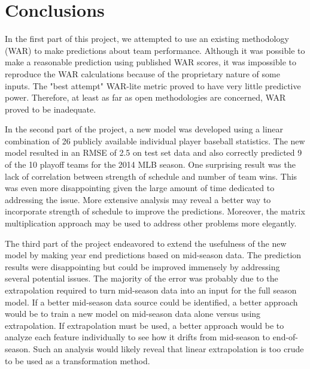 \documentclass{article} %
\begin{document}
\section{Conclusions}
In the first part of this project, we attempted to use an existing methodology (WAR) to make predictions about team performance.  Although it was possible to make a reasonable prediction using published WAR scores, it was impossible to reproduce the WAR calculations because of the proprietary nature of some inputs.  The "best attempt" WAR-lite metric proved to have very little predictive power.  Therefore, at least as far as open methodologies are concerned, WAR proved to be inadequate.  

In the second part of the project, a new model was developed using a linear combination of 26 publicly available individual player baseball statistics.  The new model resulted in an RMSE of 2.5 on test set data and also correctly predicted 9 of the 10 playoff teams for the 2014 MLB season.  One surprising result was the lack of correlation between strength of schedule and number of team wins.  This was even more disappointing given the large amount of time dedicated to addressing the issue.  More extensive analysis may reveal a better way to incorporate strength of schedule to improve the predictions.  Moreover, the matrix multiplication approach may be used to address other problems more elegantly.

The third part of the project endeavored to extend the usefulness of the new model by making year end predictions based on mid-season data.  The prediction results were disappointing but could be improved immensely by addressing several potential issues.  The majority of the error was probably due to the extrapolation required to turn mid-season data into an input for the full season model. If a better mid-season data source could be identified, a better approach would be to train a new model on mid-season data alone versus using extrapolation.  If extrapolation must be used, a better approach would be to analyze each feature individually to see how it drifts from mid-season to end-of-season.  Such an analysis would likely reveal that linear extrapolation is too crude to be used as a transformation method.  
\end{document}
